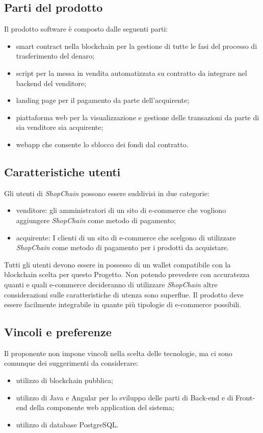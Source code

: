 \documentclass[a4paper, 12pt]{article}
\begin{document}
\subsection{Parti del prodotto}
Il prodotto software è composto dalle seguenti parti:
\begin{itemize}
\item smart contract nella blockchain per la gestione di tutte le fasi del processo di trasferimento del denaro;
\item script per la messa in vendita automatizzata su contratto da integrare nel backend del venditore;
\item landing page per il pagamento da parte dell'acquirente;
\item piattaforma web per la visualizzazione e gestione delle transazioni da parte di sia venditore sia acquirente;
\item webapp che consente lo sblocco dei fondi dal contratto.
\end{itemize}
\subsection{Caratteristiche utenti}
Gli utenti di \textit{ShopChain} possono essere suddivisi in due categorie:
\begin{itemize}
\item venditore: gli amministratori di un sito di e-commerce che vogliono aggiungere \textit{ShopChain} come metodo di pagamento;
\item acquirente: I clienti di un sito di e-commerce che scelgono di utilizzare \textit{ShopChain} come metodo di pagamento per i prodotti da acquistare.
\end{itemize}
Tutti gli utenti devono essere in possesso di un wallet compatibile con la blockchain scelta per questo Progetto.
Non potendo prevedere con accuratezza quanti e quali e-commerce decideranno di utilizzare \textit{ShopChain} altre considerazioni sulle caratteristiche di utenza sono superflue. Il prodotto deve essere facilmente integrabile in quante più tipologie di e-commerce possibili.

\subsection{Vincoli e preferenze}
Il proponente non impone vincoli nella scelta delle tecnologie, ma ci sono comunque dei suggerimenti da considerare:
\begin{itemize}
\item utilizzo di blockchain pubblica;
\item utilizzo di Java e Angular per lo sviluppo delle parti di Back-end e di Front-end della componente web application del sistema;
\item utilizzo di database PostgreSQL.
\end{itemize}
\end{document}
